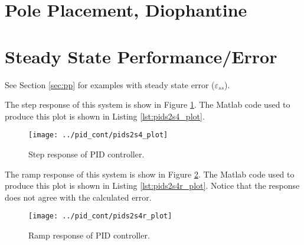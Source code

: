 \documentclass{article}
\newcommand{\sincludepdf}[2][]{
	
}
\begin{document}
\clearpage
\section{Pole Placement, Diophantine}

\section{Steady State Performance/Error}

See Section \ref{sec:pp} for examples with steady state error ($\varepsilon_{ss}$).


\sincludepdf[pages={5},
	pagecommand=\section{PID Controller Design}\label{sec:pid}\subsection*{Example 1}
		]{scan/11221301.pdf}

\sincludepdf[pages={7}]{scan/11241301.pdf}

The step response of this system is show in Figure \ref{fig:pids2s4_plot}.
The Matlab code used to produce this plot is shown
in Listing \ref{lst:pids2s4_plot}.

\begin{figure}[h!]
\begin{center}
\texttt{[image: ../pid\_cont/pids2s4\_plot]}
\end{center}
\caption{Step response of PID controller.}
\label{fig:pids2s4_plot}
\end{figure}



\sincludepdf[pages={8}]{scan/11241301.pdf}

The ramp response of this system is show in Figure \ref{fig:pids2s4r_plot}.
The Matlab code used to produce this plot is shown
in Listing \ref{lst:pids2s4r_plot}.
Notice that the response does not agree with the calculated error.

\begin{figure}[h!]
\begin{center}
\texttt{[image: ../pid\_cont/pids2s4r\_plot]}
\end{center}
\caption{Ramp response of PID controller.}
\label{fig:pids2s4r_plot}
\end{figure}
\end{document}

